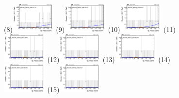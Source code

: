 \begin{figure}[h!]
        \subfigure(8){\includegraphics[width=0.2\textwidth]{power_law/plots/tauhB/massfit_tauhB_40bins_bdtcut-0.01.png}}
        \subfigure(9){\includegraphics[width=0.2\textwidth]{power_law/plots/tauhB/massfit_tauhB_40bins_bdtcut0.03.png}}
        \subfigure(10){\includegraphics[width=0.2\textwidth]{power_law/plots/tauhB/massfit_tauhB_40bins_bdtcut0.07.png}}
        \subfigure(11){\includegraphics[width=0.2\textwidth]{power_law/plots/tauhB/massfit_tauhB_40bins_bdtcut0.11.png}}
        \subfigure(12){\includegraphics[width=0.2\textwidth]{power_law/plots/tauhB/massfit_tauhB_40bins_bdtcut0.15.png}}
        \subfigure(13){\includegraphics[width=0.2\textwidth]{power_law/plots/tauhB/massfit_tauhB_40bins_bdtcut0.19.png}}
        \subfigure(14){\includegraphics[width=0.2\textwidth]{power_law/plots/tauhB/massfit_tauhB_40bins_bdtcut0.23.png}}
        \subfigure(15){\includegraphics[width=0.2\textwidth]{power_law/plots/tauhB/massfit_tauhB_40bins_bdtcut0.27.png}}

\end{figure}
